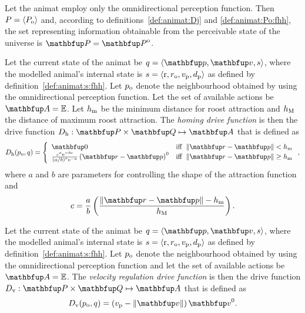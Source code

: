 Let the animat employ only the omnidirectional perception function. Then $P=\langle P_\textnormal{o} \rangle$ and, according to definitions~\ref{def:animat:Dj} and \ref{def:animat:Po:fhh}, the set representing information obtainable from the perceivable state of the universe is $\set{P}=\set{P}^\textnormal{o}$.

\begin{definition}
\label{def:animat:Dh:fhh}
Let the current state of the animat be $q=\langle\vect{p},\vect{v},s\rangle$, where the modelled animal's internal state is $s=\langle\mathrm{r},r_\textnormal{o},v_\textnormal{p},d_\textnormal{p}\rangle$ as defined by definition~\ref{def:animat:s:fhh}. Let $p_\textnormal{o}$ denote the neighbourhood obtained by using the omnidirectional perception function. Let the set of available actions be $\set{A}=\E$. Let $h_\textnormal{m}$ be the minimum distance for roost attraction and $h_\textnormal{M}$ the distance of maximum roost attraction. The \emph{homing drive function} is then the drive function $D_\textnormal{h}: \set{P} \times \set{Q} \mapsto \set{A}$ that is defined as 
\begin{equation}
D_\textnormal{h}(p_\textnormal{o}, q) = \left\{
\begin{array}{ll}
\vect{0} & \mathrm{iff}\ \left\|\vect{r}-\vect{p}\right\| < h_\textnormal{m} \\
\frac{c^a \mathrm{e}^{-bc}}{\left(a/b\right)^a \mathrm{e}^{-a}} \left(\vect{r}-\vect{p}\right)^0  & \mathrm{iff}\ \left\|\vect{r}-\vect{p}\right\| \geq h_\textnormal{m}
\end{array}
\right., \label{eq:animat:Dr:fhh}
\end{equation}
where $a$ and $b$ are parameters for controlling the shape of the attraction function and 
\begin{equation}
c=\frac{a}{b}\left(\frac{\left\|\vect{r}-\vect{p}\right\|-h_\textnormal{m}}{h_\textnormal{M}}\right).
\end{equation}
\end{definition}

\begin{definition}
\label{def:animat:Dv:cwr}
Let the current state of the animat be $q=\langle\vect{p},\vect{v},s\rangle$, where the modelled animal's internal state is $s=\langle\mathrm{r},r_\textnormal{o},v_\textnormal{p},d_\textnormal{p}\rangle$ as defined by definition~\ref{def:animat:s:fhh}. Let $p_\textnormal{o}$ denote the neighbourhood obtained by using the omnidirectional perception function and let the set of available actions be $\set{A}=\E$. The \emph{velocity regulation drive function} is then the drive function $D_\textnormal{v}: \set{P} \times \set{Q} \mapsto \set{A}$ that is defined as 
\begin{equation}
D_\textnormal{v}(p_\textnormal{o}, q) = \left(v_\textnormal{p}-\left\|\vect{v}\right\|\right)\vect{v}^0. \label{eq:animat:Dv:fhh}
\end{equation}
\end{definition}

